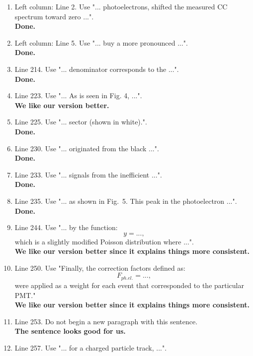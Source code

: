\documentclass[,superscriptaddress,showpacs,amssymb,amsmath,amsfonts,linenumbers,article]{revtex4-1}
\begin{document}
\begin{itemize}
\begin{enumerate} 

\item Left column: Line 2. Use "... photoelectrons, shifted the measured CC spectrum toward zero ...". \\
{\bf Done.}
\item Left column: Line 5. Use "... buy a more pronounced ...". \\
{\bf Done.}
\item Line 214. Use "... denominator corresponds to the ...". \\
{\bf Done.}
\item Line 223. Use "... As is seen in Fig. 4, ...".\\
{\bf We like our version better.}
\item Line 225. Use "... sector (shown in white).". \\
{\bf Done.}
\item Line 230. Use "... originated from the black ...". \\
{\bf Done.}
\item Line 233. Use "... signals from the inefficient ...".\\
{\bf Done.}
\item Line 235. Use "... as shown in Fig.~5. This peak in the photoelectron ...". \\
{\bf Done.}
\item Line 244. Use "... by the function:
     \begin{equation}
       y = ...   ,
     \end{equation}
    which is a slightly modified Poisson distribution where ...".\\
 {\bf  We like our version better since it explains things more consistent.}
\item Line 250. Use "Finally, the correction factors defined as:
    \begin{equation}
     F_{ph. el.} = ... ,
    \end{equation}
    were applied as a weight for each event that corresponded to the particular PMT."\\
 {\bf  We like our version better since it explains things more consistent.}
\item Line 253. Do not begin a new paragraph with this sentence.\\
{\bf The sentence looks good for us.}
\item Line 257. Use "... for a charged particle track, ...".\\

\end{enumerate}
\end{itemize}
\end{document}
